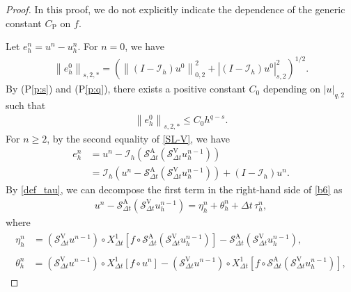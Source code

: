 \documentclass[10pt,a4paper,tbtags,leqno]{amsart}
\theoremstyle{definition}
\numberwithin{equation}{section}
\def\norm#1#2{\left\|#2\right\|_{#1}}
\def\snorm#1#2{\left|#2\right|_{#1}}
\begin{document}
\begin{proof} 
  In this proof, we do not explicitly indicate the dependence of the generic constant $C_{\mathrm{P}}$ on $f$. 

  Let $ e_h^n = u^n - u_h^n $. For $ n = 0 $, we have 
  \begin{align}
    \norm{s, 2, \ast}{e_h^0} = \left(\norm{0, 2}{(I - \mathcal{I}_{h}) u^0}^2 + \snorm{s, 2}{(I - \mathcal{I}_{h}) u^0}^2\right)^{1/2}. 
  \end{align}
  By (P\ref{p:s}) and (P\ref{p:q}), there exists a positive constant $ C_0 $ depending on $ \snorm{q, 2}{u} $ such that 
  \begin{align} 
    \norm{s, 2, \ast}{e_h^0} \leq C_0 h^{q - s}. 
    \label{b0}
  \end{align}
  For $ n \geq 2 $, by the second equality of \eqref{SL-V}, we have 
  \begin{align} 
    e_h^n 
    & = u^n - \mathcal{I}_{h} (\mathcal{S}_{\Delta t}^{\mathrm{A}} (\mathcal{S}_{\Delta t}^{\mathrm{V}} u_h^{n - 1})) \\
    & = \mathcal{I}_{h} (u^n - \mathcal{S}_{\Delta t}^{\mathrm{A}} (\mathcal{S}_{\Delta t}^{\mathrm{V}} u_h^{n - 1})) + (I - \mathcal{I}_{h}) u^n. 
    \label{b6}
  \end{align} 
  By \eqref{def_tau}, we can decompose the first term in the right-hand side of \eqref{b6} as 
  \begin{align}
    u^n - \mathcal{S}_{\Delta t}^{\mathrm{A}} (\mathcal{S}_{\Delta t}^{\mathrm{V}} u_h^{n - 1}) = \eta_h^n + \theta_h^n + \Delta t \, \tau_h^n, \label{b9} 
  \end{align} 
  where 
  \begin{gather}
    \begin{aligned}
      \eta_h^n & = (\mathcal{S}_{\Delta t}^{\mathrm{V}} u^{n - 1}) \circ {X_{\Delta t}^1} [f \circ \mathcal{S}_{\Delta t}^{\mathrm{A}} (\mathcal{S}_{\Delta t}^{\mathrm{V}} u_h^{n - 1})] - \mathcal{S}_{\Delta t}^{\mathrm{A}} (\mathcal{S}_{\Delta t}^{\mathrm{V}} u_h^{n - 1}), 
    \end{aligned} \\ 
    \begin{aligned} 
      \theta_h^n & = (\mathcal{S}_{\Delta t}^{\mathrm{V}} u^{n - 1}) \circ {X_{\Delta t}^1} [f \circ u^n] - (\mathcal{S}_{\Delta t}^{\mathrm{V}} u^{n - 1}) \circ {X_{\Delta t}^1} [f \circ \mathcal{S}_{\Delta t}^{\mathrm{A}} (\mathcal{S}_{\Delta t}^{\mathrm{V}} u_h^{n - 1})], \label{b9-3} 
    \end{aligned} 
  \end{gather} 

\end{proof}
\end{document}
